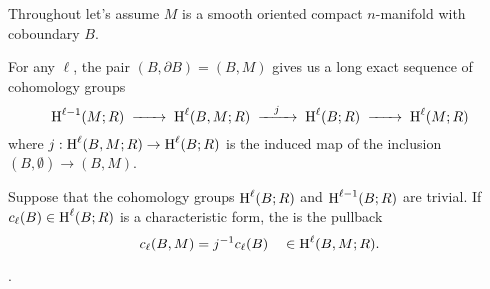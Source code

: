 Throughout let's assume $M$ is a smooth oriented compact $n$-manifold with coboundary $B$.


For any $\ell$, the pair $(B, \partial B) = (B, M)$ gives us a long exact sequence of cohomology groups
\[
  \H^{\ell-1}(M;R) \lkxto \H^{\ell}(B, M; R) \lkxto[j] \H^{\ell}(B; R) \lkxto \H^{\ell}(M; R)
\]
where $j : \operatorname{H}^{\ell}(B, M; R) \to \operatorname{H}^{\ell}(B; R)$ is the induced map of the inclusion $(B,\emptyset) \to (B, M)$. 

\begin{definition}
  Suppose that the cohomology groups $\operatorname{H}^{\ell}(B; R)$ and $\operatorname{H}^{\ell-1}(B; R)$ are trivial. If $c_\ell(B) \in \operatorname{H}^{\ell}(B; R)$ is a characteristic form, the  is the pullback
  \[
    c_\ell(B, M) = j^{-1} c_\ell(B) \quad\in \operatorname{H}^{\ell}(B, M; R).
  \]
\end{definition}

\begin{remark}
 \cite{witten1985global}.
\end{remark}



